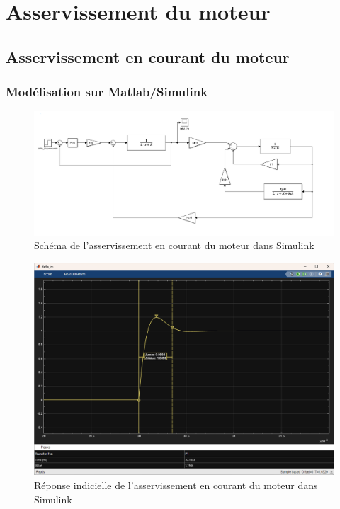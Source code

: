 \section{Asservissement du moteur}

\subsection{Asservissement en courant du moteur}

\subsubsection{Modélisation sur Matlab/Simulink}

\begin{figure}[H]
    \centering
    \includegraphics[width=1\textwidth]{images/boucle_de_courant/Simulink_boucle_de_courant.png}
    \caption{Schéma de l'asservissement en courant du moteur dans Simulink}
    \label{fig:asservissement_courant_simulink}
\end{figure}

\begin{figure}[H]
    \centering
    \includegraphics[width=1\textwidth]{images/boucle_de_courant/Simulink_reponse_indicielle_courant.png}
    \caption{Réponse indicielle de l'asservissement en courant du moteur dans Simulink}
    \label{fig:reponse_indicielle_courant_simulink}
\end{figure}

